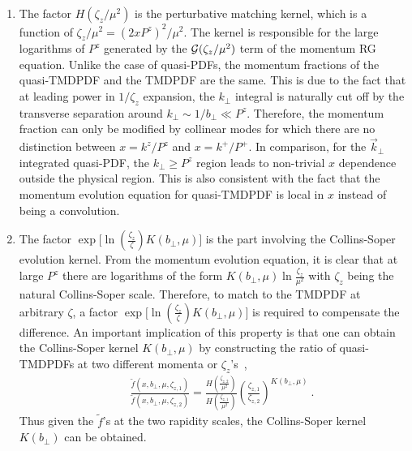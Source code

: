 \begin{enumerate}
	\item The factor $ H(\zeta_z/\mu^2)$ is the perturbative matching kernel, which is a function of $\zeta_z/\mu^2=(2xP^z)^2/\mu^2$. The kernel is responsible for the large logarithms of $P^z$ generated by the ${\cal G}(\zeta_z/\mu^2)$ term of the momentum RG equation. Unlike the case of quasi-PDFs, the momentum fractions of the quasi-TMDPDF and the TMDPDF are the same. This is due to the fact that at leading power in $1/\zeta_z$ expansion, the $k_\perp$ integral is naturally cut off by the transverse separation around $k_\perp \sim 1/b_\perp \ll P^z$. Therefore, the momentum fraction can only be modified by collinear modes for which there are no distinction between $x=k^z/P^z$ and $x=k^+/P^+$. In comparison, for the $\vec{k}_\perp$ integrated quasi-PDF, the $k_\perp \ge P^z$ region leads to non-trivial $x$ dependence outside the physical region. This is also consistent with the fact that the momentum evolution equation for quasi-TMDPDF is local in $x$ instead of being a convolution.
	\item The factor $\exp\big[\ln (\frac{\zeta_z}{\zeta})K(b_\perp,\mu)\big]$ is the part involving the Collins-Soper evolution kernel. From the momentum evolution equation, it is clear that at large $P^z$ there are logarithms of the form $K(b_\perp,\mu)\ln \frac{\zeta_z}{\mu^2}  $ with $\zeta_z$ being the natural Collins-Soper scale. Therefore, to match to the TMDPDF at arbitrary $\zeta$, a factor $\exp\big[\ln (\frac{\zeta_z}{\zeta})K(b_\perp,\mu)\big]$ is required to compensate the difference. An important implication of this property is that one can obtain the Collins-Soper kernel $K(b_\perp,\mu)$ by constructing the ratio of quasi-TMDPDFs at two different momenta or $\zeta_z$'s~\cite{Ebert:2018gzl},
	\begin{align}
		\label{eq:TMD-CS_kernel}
		\ \ \quad\frac{\tilde f(x,b_\perp,\mu,\zeta_{z,1})}{\tilde f(x,b_\perp,\mu,\zeta_{z,2})}=\frac{H\left(\frac{\zeta_{z,2}}{\mu^2}\right)}{H\left(\frac{\zeta_{z,1}}{\mu^2}\right)}\left(\frac{\zeta_{z,1}}{\zeta_{z,2}}\right)^{K(b_\perp,\mu)} \ .
	\end{align}
	Thus given the $\tilde f$'s at the two rapidity scales, the Collins-Soper kernel $K(b_\perp)$ can be obtained.
	
\end{enumerate}

